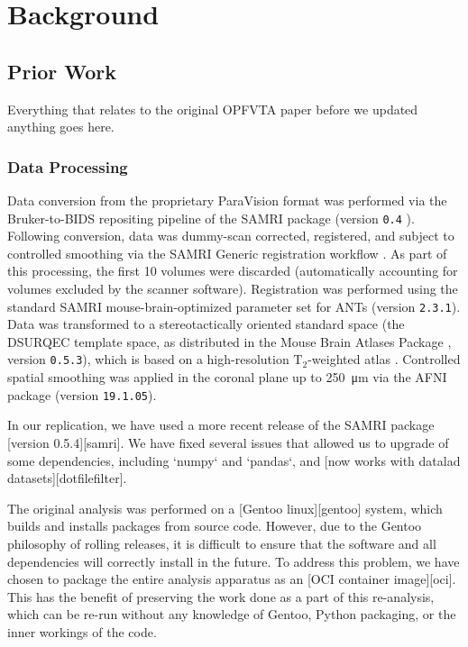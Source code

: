 \section{Background}

\subsection{Prior Work}
Everything that relates to the original OPFVTA paper before we updated anything goes here.

\subsubsection{Data Processing}

Data conversion from the proprietary ParaVision format was performed via the Bruker-to-BIDS repositing pipeline \cite{aowsis} of the SAMRI package (version \textcolor{mg}{\texttt{0.4}} \cite{samri}).
Following conversion, data was dummy-scan corrected, registered, and subject to controlled smoothing via the SAMRI Generic registration workflow \cite{irsabi}.
As part of this processing, the first 10 volumes were discarded (automatically accounting for volumes excluded by the scanner software).
Registration was performed using the standard SAMRI mouse-brain-optimized parameter set for ANTs \cite{ants} (version \textcolor{mg}{\texttt{2.3.1}}).
Data was transformed to a stereotactically oriented standard space (the DSURQEC template space, as distributed in the Mouse Brain Atlases Package \cite{atlases_generator}, version \textcolor{mg}{\texttt{0.5.3}}), which is based on a high-resolution $\mathrm{T_2}$-weighted atlas \cite{dsu1}.
Controlled spatial smoothing was applied in the coronal plane up to \SI{250}{\micro\meter} via the AFNI package \cite{afni} (version \textcolor{mg}{\texttt{19.1.05}}).

In our replication, we have used a more recent release of the SAMRI package [version 0.5.4][samri]. We have fixed several issues that allowed us to upgrade of some dependencies, including `numpy` and `pandas`, and [now works with datalad datasets][dotfilefilter].



The original analysis was performed on a [Gentoo linux][gentoo] system,
which builds and installs packages from source code. However, due to the 
Gentoo philosophy of rolling releases, it is difficult to ensure that
the software and all dependencies will correctly install in the future.
To address this problem, we have chosen to package the entire analysis
apparatus as an [OCI container image][oci]. This has the benefit of
preserving the work done as a part of this re-analysis, which can be
re-run without any knowledge of Gentoo, Python packaging, or the inner
workings of the code.

